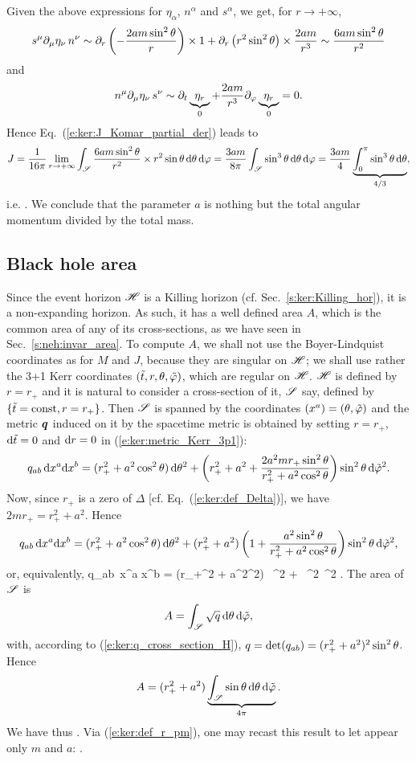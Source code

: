 Given the above expressions for $\eta_\alpha$, $n^\alpha$ and $s^\alpha$,
we get, for $r\rightarrow+\infty$,
\[
  s^\mu \partial_\mu \eta_\nu \, n^\nu \sim \partial_r \left( - \frac{2 a m \sin^2\theta}{r} \right) \times 1 + \partial_r \left(r^2 \sin^2\theta \right) \times \frac{2 a m}{r^3}
    \sim \frac{6 a m \sin^2\theta}{r^2}
\]
and
\[
    n^\mu \partial_\mu \eta_\nu \, s^\nu \sim \partial_t \underbrace{\eta_r}_{0}
        + \frac{2 a m}{r^3} \partial_\varphi \underbrace{\eta_r}_{0}  = 0 .
\]
Hence Eq.~(\ref{e:ker:J_Komar_partial_der}) leads to
\[
    J = \frac{1}{16\pi} \lim_{r\rightarrow +\infty}
        \int_{\mathscr{S}}
        \frac{6 a m \sin^2\theta}{r^2} \times
        r^2\sin\theta \, \mathrm{d}\theta\, \mathrm{d}\varphi  =
        \frac{3 a m}{8\pi} \int_{\mathscr{S}} \sin^3\theta \, \mathrm{d}\theta\, \mathrm{d}\varphi
        = \frac{3 a m}{4} \underbrace{\int_0^\pi \sin^3\theta \, \mathrm{d}\theta}_{4/3} ,
\]
i.e.
\be
     .
\ee
We conclude that the parameter $a$ is nothing but the total angular momentum
divided by the total mass.

\subsection{Black hole area}

Since the event horizon $\mathscr{H}$ is a Killing horizon (cf. Sec.~\ref{s:ker:Killing_hor}),
it is a non-expanding horizon. As such, it has a well defined
area $A$, which is the
common area of any of its cross-sections, as we have seen in
Sec.~\ref{s:neh:invar_area}. To compute $A$, we shall not use the Boyer-Lindquist
coordinates as for $M$ and $J$, because they are singular on $\mathscr{H}$; we shall
use rather the 3+1 Kerr coordinates $({\tilde t}, r, \theta,{\tilde\varphi})$, which are regular
on $\mathscr{H}$. $\mathscr{H}$ is defined by $r=r_+$ and it is natural to consider a
cross-section of it, $\mathscr{S}$ say, defined by $\{{\tilde t}=\mathrm{const}, r=r_+\}$.
Then $\mathscr{S}$ is spanned by the coordinates $(x^a) = (\theta,{\tilde\varphi})$ and the metric $\bm{q}$
induced on it by the spacetime metric is obtained by setting $r=r_+$,
$\mathrm{d}{\tilde t}=0$ and $\mathrm{d} r = 0$ in (\ref{e:ker:metric_Kerr_3p1}):
\[
        q_{ab}\,  \mathrm{d} x^a \mathrm{d} x^b =
   (r_+^2 + a^2\cos^2\theta)\, \mathrm{d} \theta^2
    + \left( r_+^2 + a^2 + \frac{2 a^2 m r_+ \sin^2\theta}{r_+^2 + a^2\cos^2\theta} \right)
    \sin^2\theta \, \mathrm{d} {\tilde\varphi}^2 .
\]
Now, since $r_+$ is a zero of $\Delta$ [cf. Eq.~(\ref{e:ker:def_Delta})],
we have $2 m r_+ = r_+^2 + a^2 $. Hence
\[
        q_{ab}\,  \mathrm{d} x^a \mathrm{d} x^b =
  (r_+^2 + a^2\cos^2\theta) \, \mathrm{d} \theta^2
    + (r_+^2 + a^2)\left( 1 + \frac{a^2 \sin^2\theta}{r_+^2 + a^2\cos^2\theta} \right)
    \sin^2\theta \, \mathrm{d} {\tilde\varphi}^2 ,
\]
or, equivalently,
\be \label{e:ker:q_cross_section_H}
        q_{ab}\,  \D x^a \D x^b =
  (r_+^2 + a^2\cos^2\th) \, \D \th^2
    + \,
    \sin^2\th \, \D \tph^2 .
\ee
The area of $\mathscr{S}$ is
\[
    A = \int_{\mathscr{S}} \sqrt{q} \, \mathrm{d}\theta\, \mathrm{d}{\tilde\varphi} ,
\]
with, according to (\ref{e:ker:q_cross_section_H}),
$q = \det (q_{ab}) = (r_+^2 + a^2)^2 \sin^2\theta$. Hence
\[
    A = (r_+^2 + a^2) \underbrace{\int_{\mathscr{S}} \sin\theta \, \mathrm{d}\theta\, \mathrm{d}{\tilde\varphi}}_{4\pi} .
\]
We have thus
\be
     .
\ee
Via (\ref{e:ker:def_r_pm}),
one may recast this result to let appear only $m$ and $a$:
\be
     .
\ee

